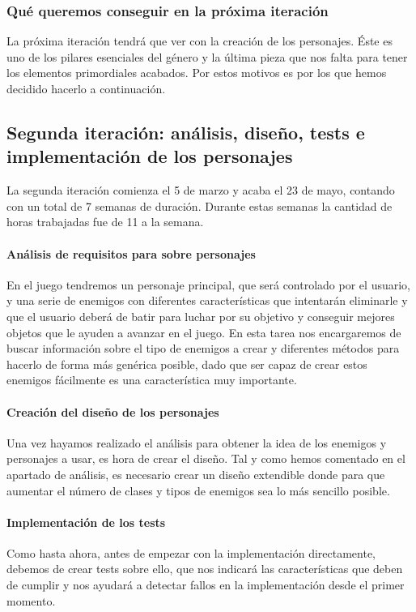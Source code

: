 \subsubsection{Qué queremos conseguir en la próxima iteración}

La próxima iteración tendrá que ver con la creación de los personajes. Éste es uno de los pilares esenciales del género y la última pieza que nos falta para tener los elementos primordiales acabados. Por estos motivos es por los que hemos decidido hacerlo a continuación.

\subsection{Segunda iteración: análisis, diseño, tests e implementación de los personajes}

La segunda iteración comienza el 5 de marzo y acaba el 23 de mayo, contando con un total de 7 semanas de duración. Durante estas semanas la cantidad de horas trabajadas fue de 11 a la semana.

\paragraph{Análisis de requisitos para sobre personajes} En el juego tendremos un personaje principal, que será controlado por el usuario, y una serie de enemigos con diferentes características que intentarán eliminarle y que el usuario deberá de batir para luchar por su objetivo y conseguir mejores objetos que le ayuden a avanzar en el juego. En esta tarea nos encargaremos de buscar información sobre el tipo de enemigos a crear y diferentes métodos para hacerlo de forma más genérica posible, dado que ser capaz de crear estos enemigos fácilmente es una característica muy importante.

\paragraph{Creación del diseño de los personajes} Una vez hayamos realizado el análisis para obtener la idea de los enemigos y personajes a usar, es hora de crear el diseño. Tal y como hemos comentado en el apartado de análisis, es necesario crear un diseño extendible donde para que aumentar el número de clases y tipos de enemigos sea lo más sencillo posible.

\paragraph{Implementación de los tests} Como hasta ahora, antes de empezar con la implementación directamente, debemos de crear tests sobre ello, que nos indicará las características que deben de cumplir y nos ayudará a detectar fallos en la implementación desde el primer momento.

